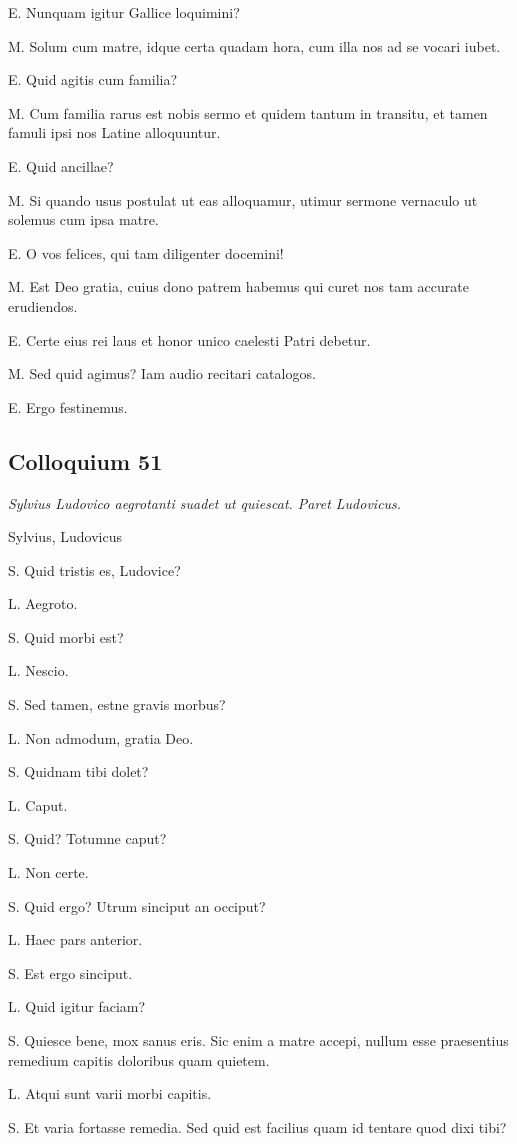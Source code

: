 \documentclass{article}
\begin{document}
E. Nunquam igitur Gallice loquimini?

M. Solum cum matre, idque certa quadam hora, cum illa nos ad se vocari iubet. 

E. Quid agitis cum familia?

M. Cum familia rarus est nobis sermo et quidem tantum in transitu, et tamen famuli ipsi nos Latine alloquuntur. 

E. Quid ancillae?

M. Si quando usus postulat ut eas alloquamur, utimur sermone vernaculo ut solemus cum ipsa matre. 

E. O vos felices, qui tam diligenter docemini!

M. Est Deo gratia, cuius dono patrem habemus qui curet nos tam accurate erudiendos. 

E. Certe eius rei laus et honor unico caelesti Patri debetur. 

M. Sed quid agimus? Iam audio recitari catalogos. 

E. Ergo festinemus. 

\subsection{Colloquium 51}
\emph{Sylvius Ludovico aegrotanti suadet ut quiescat. Paret Ludovicus.}

Sylvius, Ludovicus

S. Quid tristis es, Ludovice?

L. Aegroto. 

S. Quid morbi est?

L. Nescio. 

S. Sed tamen, estne gravis morbus?

L. Non admodum, gratia Deo. 

S. Quidnam tibi dolet?

L. Caput. 

S. Quid? Totumne caput?

L. Non certe. 

S. Quid ergo? Utrum sinciput an occiput?

L. Haec pars anterior. 

S. Est ergo sinciput. 

L. Quid igitur faciam?

S. Quiesce bene, mox sanus eris. Sic enim a matre accepi, nullum esse praesentius remedium capitis doloribus quam quietem. 

L. Atqui sunt varii morbi capitis. 

S. Et varia fortasse remedia. Sed quid est facilius quam id tentare quod dixi tibi?
\end{document}
